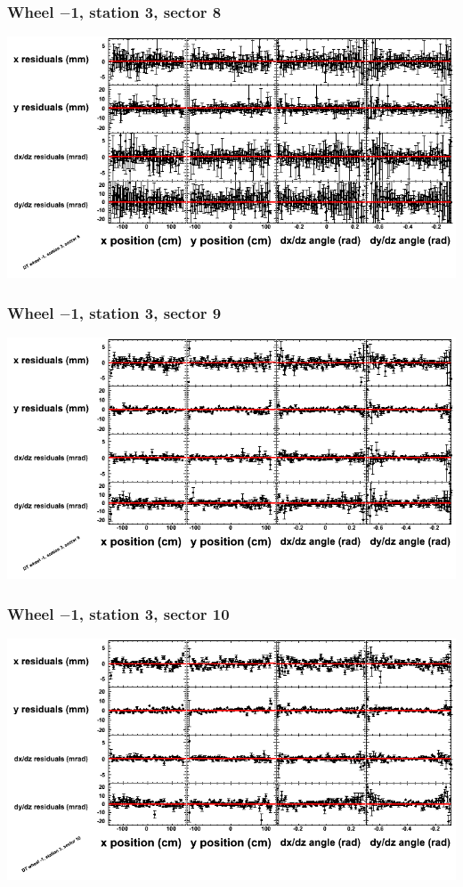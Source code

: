 \documentclass[compress]{beamer}
\begin{document}
\begin{frame}
\frametitle{Wheel $-$1, station 3, sector 8}
\includegraphics[width=\linewidth]{tmppoly_MBwhBst3sec08.png}
\end{frame}

\begin{frame}
\frametitle{Wheel $-$1, station 3, sector 9}
\includegraphics[width=\linewidth]{tmppoly_MBwhBst3sec09.png}
\end{frame}

\begin{frame}
\frametitle{Wheel $-$1, station 3, sector 10}
\includegraphics[width=\linewidth]{tmppoly_MBwhBst3sec10.png}
\end{frame}
\end{document}

